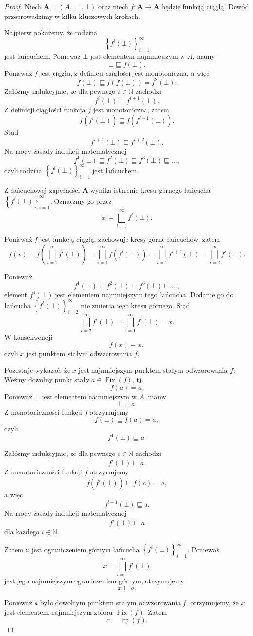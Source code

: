 \documentclass[11pt,a4paper]{article}
\theoremstyle{definition}
\theoremstyle{plain}
\newcommand{\bt}{\bot}                            %
\newcommand{\Fix}{\operatorname{Fix}}            %
\newcommand{\lfp}{\operatorname{lfp}}
\begin{document}
\begin{proof}
	Niech $\boldsymbol{A}=(A,\sqsubseteq,\bt)$ oraz niech
	$f:\boldsymbol{A}\to\boldsymbol{A}$ będzie funkcją ciągłą. Dowód przeprowadzimy w kilku kluczowych krokach.
	
	Najpierw pokażemy, że rodzina
	\[
	\left\{f^i(\bt)\right\}_{i=1}^{\infty}
	\]
	jest łańcuchem. Ponieważ $\bt$ jest elementem najmniejszym w $A$, mamy
	\[
	\bt\sqsubseteq f(\bt).
	\]
	Ponieważ $f$ jest ciągła, z definicji ciągłości jest monotoniczna, a więc
	\[
		f(\bt)\sqsubseteq f(f(\bt))=f^2(\bt).
	\]
	Załóżmy indukcyjnie, że dla pewnego $i\in\mathbb{N}$ zachodzi
	\[
	f^i(\bt)\sqsubseteq f^{i+1}(\bt).
	\]
	Z definicji ciągłości funkcja $f$ jest monotoniczna, zatem
	\[
	f\left(f^i(\bt)\right)
	\sqsubseteq
	f\left(f^{i+1}(\bt)\right).
	\]
	Stąd
	\[
	f^{i+1}(\bt)\sqsubseteq f^{i+2}(\bt).
	\]
	Na mocy zasady indukcji matematycznej
	\[
	f^1(\bt)\sqsubseteq f^2(\bt)\sqsubseteq f^3(\bt)
	\sqsubseteq\ldots,
	\]
	czyli rodzina $\left\{f^i(\bt)\right\}_{i=1}^{\infty}$ jest łańcuchem.
	
	Z łańcuchowej zupełności $\boldsymbol{A}$ wynika istnienie kresu górnego
	łańcucha $\left\{f^i(\bt)\right\}_{i=1}^{\infty}$. Oznaczmy go przez
	\[
	x\coloneqq \bigsqcup_{i=1}^{\infty}f^i(\bt).
	\]
	
	Ponieważ $f$ jest funkcją ciągłą, zachowuje kresy górne łańcuchów, zatem
	\[
		f(x)
		=f\left(\bigsqcup_{i=1}^{\infty}f^i(\bt)\right)
		=\bigsqcup_{i=1}^{\infty}f\left(f^i(\bt)\right)
		=\bigsqcup_{i=1}^{\infty}f^{i+1}(\bt)
		=\bigsqcup_{i=2}^{\infty}f^i(\bt).
	\]
	
	Ponieważ
	\[
	f^1(\bt)\sqsubseteq f^2(\bt)\sqsubseteq f^3(\bt)
	\sqsubseteq\ldots,
	\]
	element $f^1(\bt)$ jest elementem najmniejszym tego łańcucha.
	Dodanie go do łańcucha
	$\left\{f^i(\bt)\right\}_{i=2}^{\infty}$ nie zmienia jego kresu górnego.
	Stąd
	\[
	\bigsqcup_{i=2}^{\infty}f^i(\bt)
	=
	\bigsqcup_{i=1}^{\infty}f^i(\bt)
	=x.
	\]
	W konsekwencji
	\[
	f(x)=x,
	\]
	czyli $x$ jest punktem stałym odwzorowania $f$.
	
	Pozostaje wykazać, że $x$ jest najmniejszym punktem stałym odwzorowania $f$.
	Weźmy dowolny punkt stały $a\in\Fix(f)$, tj.
	\[
	f(a)=a.
	\]
	Ponieważ $\bt$ jest elementem najmniejszym w $A$, mamy
	\[
	\bt\sqsubseteq a.
	\]
	Z monotoniczności funkcji $f$ otrzymujemy
	\[
	f(\bt)\sqsubseteq f(a)=a,
	\]
	czyli
	\[
	f^1(\bt)\sqsubseteq a.
	\]
	
	Załóżmy indukcyjnie, że dla pewnego $i \in \mathbb{N}$ zachodzi
	\[
	f^i(\bt)\sqsubseteq a.
	\]
	Z monotoniczności funkcji $f$ otrzymujemy
	\[
	f\left(f^i(\bt)\right)\sqsubseteq f(a)=a,
	\]
	a więc
	\[
	f^{i+1}(\bt)\sqsubseteq a.
	\]
	Na mocy zasady indukcji matematycznej
	\[
	f^i(\bt)\sqsubseteq a
	\]
	dla każdego $i \in \mathbb{N}$.
	
	Zatem $a$ jest ograniczeniem górnym łańcucha
	$\left\{f^i(\bt)\right\}_{i=1}^{\infty}$. Ponieważ
	\[
	x=\bigsqcup_{i=1}^{\infty}f^i(\bt)
	\]
	jest jego najmniejszym ograniczeniem górnym, otrzymujemy
	\[
	x\sqsubseteq a.
	\]
	
	Ponieważ $a$ było dowolnym punktem stałym odwzorowania $f$, otrzymujemy,
	że $x$ jest elementem najmniejszym zbioru $\Fix(f)$. Zatem
	\[
	x=\lfp(f).
	\]
\end{proof}
\end{document}
